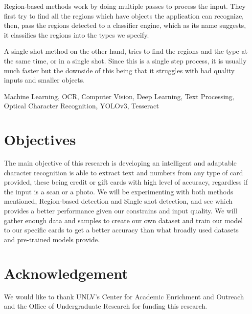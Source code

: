 \documentclass[conference]{IEEEtran}
\begin{document}
Region-based methods work by doing multiple passes to process the input. They first try to find all the regions which have objects the application can recognize, then, pass the regions detected to a classifier engine, which as its name suggests, it classifies the regions into the types we specify.

A single shot method on the other hand, tries to find the regions and the type at the same time, or in a single shot. Since this is a single step process, it is usually much faster but the downside of this being that it struggles with bad quality inputs and smaller objects.





\begin{IEEEkeywords}
  Machine Learning, OCR, Computer Vision, Deep Learning, Text Processing, Optical Character Recognition, YOLOv3, Tesseract
\end{IEEEkeywords}

%
\IEEEpeerreviewmaketitle



\section{Objectives}\label{section:Objectives}

The main objective of this research is developing an intelligent and adaptable character recognition is able to extract text and numbers from any type of card provided, these being credit or gift cards with high level of accuracy, regardless if the input is a scan or a photo.
We will be experimenting with both methods mentioned, Region-based detection and Single shot detection, and see which provides a better performance given our constrains and input quality.
We will gather enough data and samples to create our own dataset and train our model to our specific cards to get a better accuracy than what broadly used datasets and pre-trained models provide.\\



\section{Acknowledgement}\label{section:acknowledgement}
We would like to thank UNLV's Center for Academic Enrichment and Outreach and the Office of Undergraduate Research for funding this research. 




 
\end{document}
